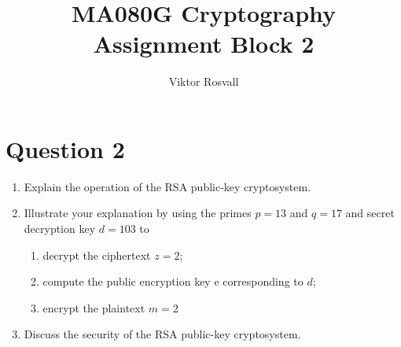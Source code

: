 \documentclass{article}
\title{MA080G Cryptography Assignment Block 2}
\author{Viktor Rosvall}
\begin{document}
	\maketitle
	
	\section*{Question 2}
	\renewcommand{\theenumi}{\alph{enumi}}
	\renewcommand{\theenumii}{\roman{enumii}}
	\begin{enumerate}
		\item Explain the operation of the RSA public-key cryptosystem.
		
		\item Illustrate your explanation by using the primes $p = 13$ and $q = 17$ and secret decryption key $d = 103$ to
		\begin{enumerate}
			\item  decrypt the ciphertext $z = 2$;
			\item compute the public encryption key e corresponding to $d$;
			\item  encrypt the plaintext $m = 2$
  		\end{enumerate}
  	
  	\item Discuss the security of the RSA public-key cryptosystem.
	\end{enumerate}	
\end{document}
